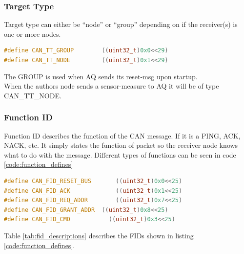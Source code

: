 \subsubsection{Target Type}
Target type can either be “node” or “group” depending on if the receiver(s) is one or more nodes. 
\begin{lstlisting}[language = c, caption = Target type defined in AQ, label=code:target_types]
#define CAN_TT_GROUP        ((uint32_t)0x0<<29)
#define CAN_TT_NODE         ((uint32_t)0x1<<29)
\end{lstlisting}
The GROUP is used when AQ sends its reset-msg upon startup.\\
When the authors node sends a sensor-measure to AQ it will be of type CAN\_TT\_NODE.
\subsubsection{Function ID}

Function ID describes the function of the CAN message. If it is a PING, ACK, NACK, etc.
It simply states the function of packet so the receiver node knows what to do with the message.
Different types of functions can be seen in code \ref{code:function_defines}
\begin{lstlisting}[language = c, caption = Excerpts from AQ's list of function defines, label=code:function_defines]
#define CAN_FID_RESET_BUS		((uint32_t)0x0<<25)
#define CAN_FID_ACK				((uint32_t)0x1<<25)
#define CAN_FID_REQ_ADDR		((uint32_t)0x7<<25)
#define CAN_FID_GRANT_ADDR	((uint32_t)0x8<<25)
#define CAN_FID_CMD           ((uint32_t)0x3<<25)
\end{lstlisting}

Table \ref{tab:fid_descriptions} describes the FIDs shown in listing \ref{code:function_defines}. \\

